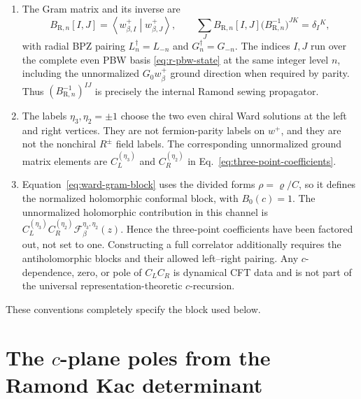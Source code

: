 \documentclass[11pt]{article}
\newcommand{\R}{\mathrm R}
\newcommand{\F}{\mathcal F}
\begin{document}
\begin{enumerate}
 \item The Gram matrix and its inverse are
 \begin{equation}
  B_{\R,n}[I,J]
  =
  \left\langle w_{\beta,I}^+\middle|w_{\beta,J}^+\right\rangle,
  \qquad
  \sum_J B_{\R,n}[I,J]
  \bigl(B_{\R,n}^{-1}\bigr)^{JK}
  =\delta_I{}^K,
  \label{eq:gram-convention}
 \end{equation}
 with radial BPZ pairing
 \(L_n^\dagger=L_{-n}\) and \(G_n^\dagger=G_{-n}\).
 The indices \(I,J\) run over the complete even PBW basis
 \eqref{eq:r-pbw-state} at the same integer level \(n\), including the
 unnormalized \(G_0w_\beta^+\) ground direction when required by
 parity.  Thus \((B_{\R,n}^{-1})^{IJ}\) is precisely the internal
 Ramond sewing propagator.

 \item The labels \(\eta_3,\eta_2=\pm1\) choose the two even chiral
 Ward solutions at the left and right vertices.  They are not
 fermion-parity labels on \(w^+\), and they are not the nonchiral
 \(R^\pm\) field labels.  The corresponding unnormalized ground
 matrix elements are \(C_L^{(\eta_3)}\) and \(C_R^{(\eta_2)}\) in
 Eq.~\eqref{eq:three-point-coefficients}.

 \item Equation~\eqref{eq:ward-gram-block} uses the divided forms
 \(\rho=\varrho/C\), so it defines the normalized holomorphic
 conformal block, with \(B_0(c)=1\).  The unnormalized holomorphic
 contribution in this channel is
 \(C_L^{(\eta_3)}C_R^{(\eta_2)}\F_\beta^{\eta_3,\eta_2}(z)\).
 Hence the three-point coefficients have been factored out, not set to
 one.  Constructing a full correlator additionally requires the
 antiholomorphic blocks and their allowed left--right pairing.  Any
 \(c\)-dependence, zero, or pole of \(C_LC_R\) is dynamical CFT data
 and is not part of the universal representation-theoretic
 \(c\)-recursion.
\end{enumerate}
These conventions completely specify the block used below.

\section{The \(c\)-plane poles from the Ramond Kac determinant}
\end{document}
